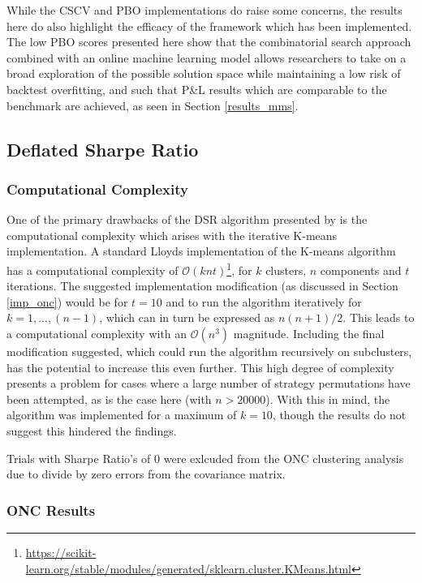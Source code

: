 \documentclass[a4paper,11pt,oneside]{article}
\theoremstyle{plain}
\theoremstyle{definition}
\begin{document}
	
	While the CSCV and PBO implementations do raise some concerns, the results here do also highlight the efficacy of the framework which has been implemented. The low PBO scores presented here show that the combinatorial search approach combined with an online machine learning model allows researchers to take on a broad exploration of the possible solution space while maintaining a low risk of backtest overfitting, and such that P\&L results which are comparable to the benchmark are achieved, as seen in Section \ref{results_mms}.
	
	\newpage

	\subsection{Deflated Sharpe Ratio}\label{results_dsr}	
	
	\subsubsection{Computational Complexity}
	
	One of the primary drawbacks of the DSR algorithm presented by \citet{PradoDSR} is the computational complexity which arises with the iterative K-means implementation. A standard Lloyds implementation of the K-means algorithm has a computational complexity of $\mathcal{O}(knt)$\footnote{\url{https://scikit-learn.org/stable/modules/generated/sklearn.cluster.KMeans.html}}, for $k$ clusters, $n$ components and $t$ iterations. The suggested implementation modification (as discussed in Section \ref{imp_onc}) would be for $t=10$ and to run the algorithm iteratively for $k=1,...,(n-1)$, which can in turn be expressed as $n(n+1)/2$. This leads to a computational complexity with an $\mathcal{O}(n^3)$ magnitude. Including the final modification suggested, which could run the algorithm recursively on subclusters, has the potential to increase this even further. This high degree of complexity presents a problem for cases where a large number of strategy permutations have been attempted, as is the case here (with $n> 20000$). With this in mind, the algorithm was implemented for a maximum of $k=10$, though the results do not suggest this hindered the findings.\newline
	
	Trials with Sharpe Ratio's of 0 were exlcuded from the ONC clustering analysis due to divide by zero errors from the covariance matrix.
	
	\subsubsection{ONC Results}\label{results_onc}
	
\end{document}
